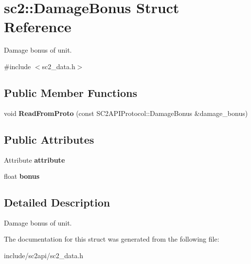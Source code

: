 \hypertarget{structsc2_1_1_damage_bonus}{}\section{sc2\+:\+:Damage\+Bonus Struct Reference}
\label{structsc2_1_1_damage_bonus}


Damage bonus of unit.  




{\ttfamily \#include $<$sc2\+\_\+data.\+h$>$}

\subsection*{Public Member Functions}
\begin{DoxyCompactItemize}
\item 
\mbox{\label{structsc2_1_1_damage_bonus_a1c12d4dd6f4b4c5a4b88b879310c485f}} 
void {\bfseries Read\+From\+Proto} (const S\+C2\+A\+P\+I\+Protocol\+::\+Damage\+Bonus \&damage\+\_\+bonus)
\end{DoxyCompactItemize}
\subsection*{Public Attributes}
\begin{DoxyCompactItemize}
\item 
\mbox{\label{structsc2_1_1_damage_bonus_a7b73a5b3cdc51dacc4de769be21b123e}} 
Attribute {\bfseries attribute}
\item 
\mbox{\label{structsc2_1_1_damage_bonus_aaaf430c71e3098f92e6779782e4a8d4c}} 
float {\bfseries bonus}
\end{DoxyCompactItemize}


\subsection{Detailed Description}
Damage bonus of unit. 

The documentation for this struct was generated from the following file\+:\begin{DoxyCompactItemize}
\item 
include/sc2api/sc2\+\_\+data.\+h\end{DoxyCompactItemize}
